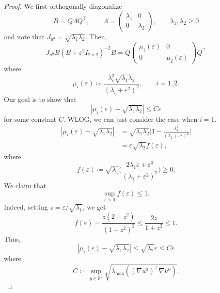 \documentclass[10pt,a4paper]{amsart}
\newcommand{\R}{\mathbb{R}}
\newcommand{\eps}{\varepsilon}
\begin{document}
\begin{proof}
    We first orthogonally diagonalize 
    \begin{equation}
        B = Q \Lambda Q^\top, \qquad \Lambda = \begin{pmatrix}
            \lambda_1 & 0 \\ 0 & \lambda_2
        \end{pmatrix},
        \qquad \lambda_1,\lambda_2 \geq 0
    \end{equation}
    and note that $J_{u^0} = \sqrt{\lambda_1 \lambda_2}$. Then,
    \begin{equation}
        J_{u^0} B (B + \eps^2 I_{2\times 2})^{-2}B = Q\begin{pmatrix}
            \mu_1(\eps) & 0 \\ 0 & \mu_2(\eps)
        \end{pmatrix}
        Q^\top
    \end{equation}
    where 
    \begin{equation}
        \mu_i(\eps) \coloneqq \frac{\lambda_i^2 \sqrt{\lambda_1 \lambda_2}}{(\lambda_i + \eps^2)^2}, \qquad i = 1,2.
    \end{equation}
    Our goal is to show that 
    \begin{equation}
        |\mu_i(\eps) - \sqrt{\lambda_1 \lambda_2}| \leq C\eps
    \end{equation}
    for some constant $C$. WLOG, we can just consider the case when $i=1$.
    \begin{equation}
        \begin{split}
            |\mu_i(\eps) - \sqrt{\lambda_1 \lambda_2}| &= \sqrt{\lambda_1 \lambda_2}\bigg|1-\frac{\lambda_1^2}{(\lambda_1 + \eps^2)^2}\bigg|\\
            &= \eps\sqrt{\lambda_2}f(\eps),
        \end{split}
    \end{equation}
    where 
    \begin{equation}
        f(\eps) \coloneqq \sqrt{\lambda_1}\bigg(\frac{2\lambda_1 \eps + \eps^3}{(\lambda_1 + \eps^2)^2}\bigg)\geq 0.
    \end{equation}
    We claim that 
    \begin{equation}
        \sup_{\eps>0} f(\eps) \leq 1.
    \end{equation}
    Indeed, setting $z = \eps/\sqrt{\lambda_1}$, we get
    \begin{equation}
        f(\eps) = \frac{z(2+z^2)}{(1+z^2)^2} \leq \frac{2z}{1+z^2} \leq 1.
    \end{equation}
    Thus,
    \begin{equation}
        |\mu_i(\eps) - \sqrt{\lambda_1 \lambda_2}| \leq \sqrt{\lambda_2}\eps \leq C\eps
    \end{equation}
    where 
    \begin{equation}
        C \coloneqq \sup_{y\in\R^2} \sqrt{\lambda_{\max}((\nabla u^0)^\top \nabla u^0)}.
    \end{equation}
    
\end{proof}
\end{document}
